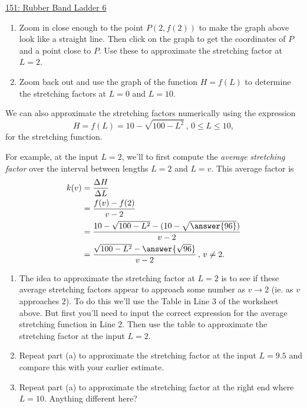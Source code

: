 \documentclass{ximera}
\begin{document}
\begin{example}
\href{https://www.desmos.com/calculator/jfwvbbrts1}{151: Rubber Band Ladder 6}

\begin{enumerate}
\item Zoom in close enough to the point $P(2,f(2))$ to make the graph above look like a straight line. Then click on the graph to get the coordinates of $P$ and a point close to $P$. Use these to approximate the stretching factor at $L=2$.


\item Zoom back out and use the graph of the function $H=f(L)$ to determine the stretching factors at $L=0$ and $L=10$.
\end{enumerate}

We can also approximate the stretching factors numerically using the expression
\[
      H = f(L) = 10- \sqrt{100-L^2} \, , \, 0\leq L \leq 10,
\] 
for the stretching function.

For example, at the input $L=2$, we'll to first compute the \emph{average stretching factor} over the interval between lengths $L=2$ and $L=v$. This average factor is 
\begin{align*}
 k(v) &= \frac{\Delta H}{\Delta L} \\
              &= \frac{f(v) - f(2)}{v-2} \\
              &=\frac{10 - \sqrt{100-L^2} - (10 - \sqrt{\answer{96}})}{v-2}   \\
              &= \frac{\sqrt{100-L^2} - \answer{\sqrt{96}}}{v-2} \, , \, v \neq 2.
\end{align*}

\begin{enumerate}
\item The idea to approximate the stretching factor at $L=2$ is to see if these average stretching factors appear to approach some number as $v\to 2$ (ie. as $v$ approaches $2$). To do this we'll use the Table in Line 3 of the worksheet above. But first you'll need to input the correct expression for the average stretching function in Line 2. Then use the table to approximate the stretching factor at the input $L=2$.

\item Repeat part (a) to approximate the stretching factor at the input $L=9.5$ and compare this with your earlier estimate.

\item Repeat part (a) to approximate the stretching factor at the right end where $L=10$. Anything different here?
\end{enumerate}
 
\end{example}
\end{document}
